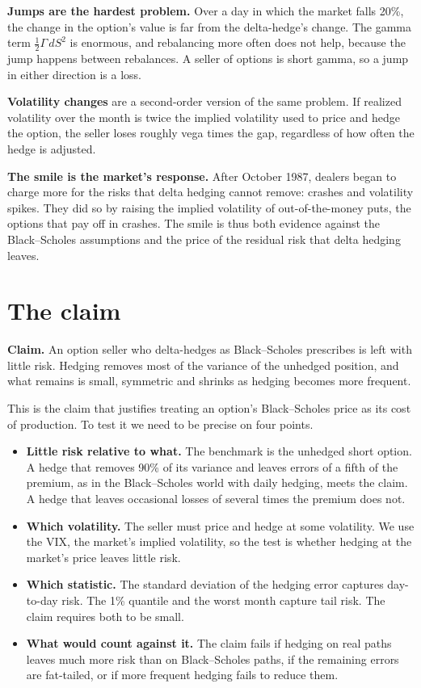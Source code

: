 \textbf{Jumps are the hardest problem.} Over a day in which the market falls 20\%, the change in the option's value is far from the delta-hedge's change. The gamma term $\tfrac{1}{2}\Gamma\,dS^2$ is enormous, and rebalancing more often does not help, because the jump happens between rebalances. A seller of options is short gamma, so a jump in either direction is a loss.

\textbf{Volatility changes} are a second-order version of the same problem. If realized volatility over the month is twice the implied volatility used to price and hedge the option, the seller loses roughly vega times the gap, regardless of how often the hedge is adjusted.

\textbf{The smile is the market's response.} After October 1987, dealers began to charge more for the risks that delta hedging cannot remove: crashes and volatility spikes. They did so by raising the implied volatility of out-of-the-money puts, the options that pay off in crashes. The smile is thus both evidence against the Black--Scholes assumptions and the price of the residual risk that delta hedging leaves.

\section{The claim}
\label{sec:15-claim}

\begin{callout}
\textbf{Claim.} An option seller who delta-hedges as Black--Scholes prescribes is left with little risk. Hedging removes most of the variance of the unhedged position, and what remains is small, symmetric and shrinks as hedging becomes more frequent.
\end{callout}

This is the claim that justifies treating an option's Black--Scholes price as its cost of production. To test it we need to be precise on four points.

\begin{itemize}
  \item \textbf{Little risk relative to what.} The benchmark is the unhedged short option. A hedge that removes 90\% of its variance and leaves errors of a fifth of the premium, as in the Black--Scholes world with daily hedging, meets the claim. A hedge that leaves occasional losses of several times the premium does not.
  \item \textbf{Which volatility.} The seller must price and hedge at some volatility. We use the VIX, the market's implied volatility, so the test is whether hedging at the market's price leaves little risk.
  \item \textbf{Which statistic.} The standard deviation of the hedging error captures day-to-day risk. The 1\% quantile and the worst month capture tail risk. The claim requires both to be small.
  \item \textbf{What would count against it.} The claim fails if hedging on real paths leaves much more risk than on Black--Scholes paths, if the remaining errors are fat-tailed, or if more frequent hedging fails to reduce them.
\end{itemize}

